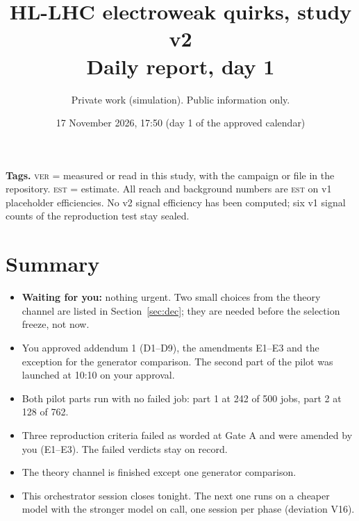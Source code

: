 \documentclass[11pt,a4paper]{article}
\title{HL-LHC electroweak quirks, study v2\\[2pt]\large Daily report, day 1}
\author{Private work (simulation). Public information only.}
\date{17 November 2026, 17:50 (day 1 of the approved calendar)}
\newcommand{\est}{\textsc{est}}
\newcommand{\ver}{\textsc{ver}}
\begin{document}
\maketitle

\noindent\textbf{Tags.} \ver{} = measured or read in this study, with the campaign or file in the repository.
\est{} = estimate. All reach and background numbers are \est{} on v1 placeholder efficiencies. No v2 signal
efficiency has been computed; six v1 signal counts of the reproduction test stay sealed.

\section{Summary}
\begin{itemize}
\item \textbf{Waiting for you:} nothing urgent. Two small choices from the theory channel are listed in
      Section~\ref{sec:dec}; they are needed before the selection freeze, not now.
\item You approved addendum 1 (D1--D9), the amendments E1--E3 and the exception for the generator comparison.
      The second part of the pilot was launched at 10:10 on your approval.
\item Both pilot parts run with no failed job: part 1 at 242 of 500 jobs, part 2 at 128 of 762.
\item Three reproduction criteria failed as worded at Gate A and were amended by you (E1--E3). The failed
      verdicts stay on record.
\item The theory channel is finished except one generator comparison.
\item This orchestrator session closes tonight. The next one runs on a cheaper model with the stronger model on
      call, one session per phase (deviation V16).
\end{itemize}
\end{document}
